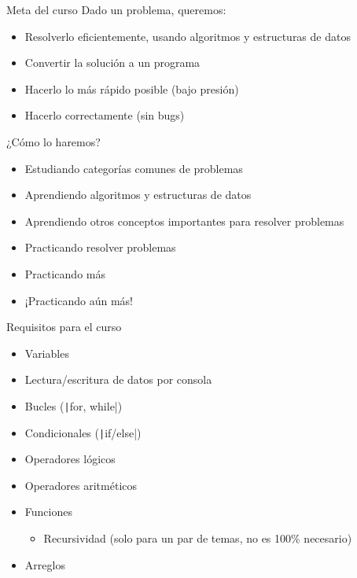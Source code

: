\documentclass[10pt]{beamer}
\newcommand{\bi}{\begin{itemize}}
\newcommand{\ei}{\end{itemize}}
\begin{document}
\begin{frame}{Meta del curso}
    Dado un problema, queremos:
    \bi
        \item Resolverlo eficientemente, usando algoritmos y estructuras de datos
        \item Convertir la solución a un programa
        \item Hacerlo lo más rápido posible (bajo presión)
        \item Hacerlo correctamente (sin bugs)
    \ei
\end{frame}

\begin{frame}{¿Cómo lo haremos?}
    \bi
        \item Estudiando categorías comunes de problemas
        \item Aprendiendo algoritmos y estructuras de datos
        \item Aprendiendo otros conceptos importantes para resolver problemas
        \item Practicando resolver problemas
        \item Practicando más
        \item ¡Practicando aún más!
    \ei
\end{frame}

\begin{frame}{Requisitos para el curso}
    \bi
        \item Variables
        \item Lectura/escritura de datos por consola
        \item Bucles (\texttt|for, while|)
        \item Condicionales (\texttt|if/else|)
        \item Operadores lógicos
        \item Operadores aritméticos
        \item Funciones
        \bi 
            \item Recursividad (solo para un par de temas, no es 100\% necesario)
        \ei
        \item Arreglos
    \ei
\end{frame}
\end{document}
